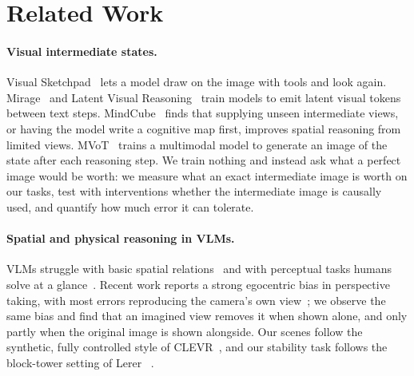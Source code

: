 \section{Related Work}
\label{sec:related}

\paragraph{Visual intermediate states.} Visual Sketchpad~\cite{hu2024sketchpad} lets a model draw on the image with tools and look again. Mirage~\cite{yang2026mirage} and Latent Visual Reasoning~\cite{li2025lvr} train models to emit latent visual tokens between text steps. MindCube~\cite{wang2026mindcube} finds that supplying unseen intermediate views, or having the model write a cognitive map first, improves spatial reasoning from limited views. MVoT~\cite{li2025mvot} trains a multimodal model to generate an image of the state after each reasoning step. We train nothing and instead ask what a perfect image would be worth: we measure what an exact intermediate image is worth on our tasks, test with interventions whether the intermediate image is causally used, and quantify how much error it can tolerate.

\paragraph{Spatial and physical reasoning in VLMs.} VLMs struggle with basic spatial relations~\cite{kamath2023whatsup} and with perceptual tasks humans solve at a glance~\cite{fu2024blink}. Recent work reports a strong egocentric bias in perspective taking, with most errors reproducing the camera's own view~\cite{wang2026egocentric}; we observe the same bias and find that an imagined view removes it when shown alone, and only partly when the original image is shown alongside. Our scenes follow the synthetic, fully controlled style of CLEVR~\cite{johnson2017clevr}, and our stability task follows the block-tower setting of Lerer \etal~\cite{lerer2016blocks}.
